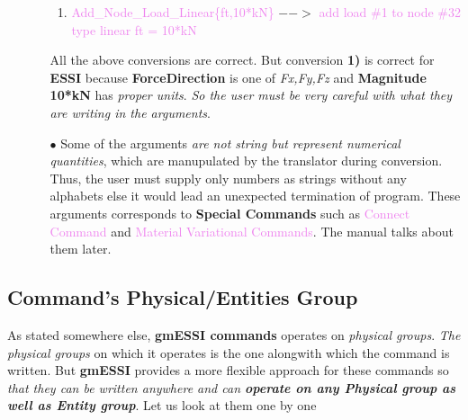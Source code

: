 \documentclass[11pt]{article}
\begin{document}
\begin{itemize}
\begin{itemize}
\begin{enumerate}
       \item      {\textcolor{violet}{Add\_Node\_Load\_Linear\{ft,10*kN\}}  $-->$
       \textcolor{violet}{add load \#1 to node \#32 type linear ft = 10*kN}}

    \end{enumerate}

    All the above conversions are correct. But conversion \textbf{1)} is correct
    for    \textbf{ESSI}    because    \textbf{ForceDirection}    is    one   of
    \textit{Fx,Fy,Fz}  and  \textbf{Magnitude} \textbf{10*kN} has \textit{proper
    units}. \emph{So the user must be very careful with what they are writing in
    the arguments}.\\

    \item[$\bullet$] Some of the arguments \textit{are not string but
    represent numerical quantities}, which are manupulated by the translator
    during conversion. Thus, the user must supply only numbers as strings without
    any alphabets else it would lead an unexpected termination of program. These
    arguments corresponds to \textbf{Special Commands} such as
    \textcolor{violet}{Connect Command} and \textcolor{violet}{Material
    Variational Commands}. The manual talks about them later.   

  \end {itemize}

\end {itemize}

\subsection{Command's Physical/Entities Group}

As stated somewhere else, \textbf{gmESSI commands} operates on \textit{
physical groups}. \textit{The physical groups} on which it operates is the
one alongwith which the command is written. But \textbf{gmESSI} provides a
more flexible approach for these commands so \textit{that they can be
written anywhere and can \textbf{operate on any Physical group as well as
Entity group}}. Let us look at them one by one
\end{document}
